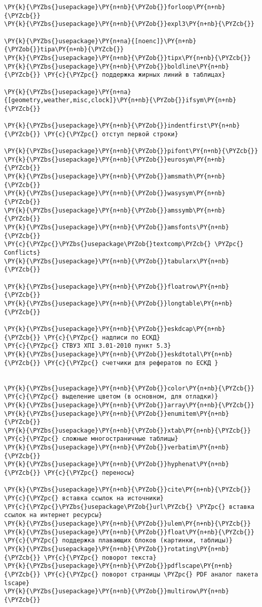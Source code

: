 \begin{Verbatim}[commandchars=\\\{\}]
\PY{k}{\PYZbs{}usepackage}\PY{n+nb}{\PYZob{}}forloop\PY{n+nb}{\PYZcb{}}
\PY{k}{\PYZbs{}usepackage}\PY{n+nb}{\PYZob{}}expl3\PY{n+nb}{\PYZcb{}}

\PY{k}{\PYZbs{}usepackage}\PY{n+na}{[noenc]}\PY{n+nb}{\PYZob{}}tipa\PY{n+nb}{\PYZcb{}}
\PY{k}{\PYZbs{}usepackage}\PY{n+nb}{\PYZob{}}tipx\PY{n+nb}{\PYZcb{}}
\PY{k}{\PYZbs{}usepackage}\PY{n+nb}{\PYZob{}}boldline\PY{n+nb}{\PYZcb{}} \PY{c}{\PYZpc{} поддержка жирных линий в таблицах}

\PY{k}{\PYZbs{}usepackage}\PY{n+na}{[geometry,weather,misc,clock]}\PY{n+nb}{\PYZob{}}ifsym\PY{n+nb}{\PYZcb{}}

\PY{k}{\PYZbs{}usepackage}\PY{n+nb}{\PYZob{}}indentfirst\PY{n+nb}{\PYZcb{}} \PY{c}{\PYZpc{} отступ первой строки}

\PY{k}{\PYZbs{}usepackage}\PY{n+nb}{\PYZob{}}pifont\PY{n+nb}{\PYZcb{}}
\PY{k}{\PYZbs{}usepackage}\PY{n+nb}{\PYZob{}}eurosym\PY{n+nb}{\PYZcb{}}
\PY{k}{\PYZbs{}usepackage}\PY{n+nb}{\PYZob{}}amsmath\PY{n+nb}{\PYZcb{}}
\PY{k}{\PYZbs{}usepackage}\PY{n+nb}{\PYZob{}}wasysym\PY{n+nb}{\PYZcb{}}
\PY{k}{\PYZbs{}usepackage}\PY{n+nb}{\PYZob{}}amssymb\PY{n+nb}{\PYZcb{}}
\PY{k}{\PYZbs{}usepackage}\PY{n+nb}{\PYZob{}}amsfonts\PY{n+nb}{\PYZcb{}}
\PY{c}{\PYZpc{}\PYZbs{}usepackage\PYZob{}textcomp\PYZcb{} \PYZpc{} Conflicts}
\PY{k}{\PYZbs{}usepackage}\PY{n+nb}{\PYZob{}}tabularx\PY{n+nb}{\PYZcb{}}

\PY{k}{\PYZbs{}usepackage}\PY{n+nb}{\PYZob{}}floatrow\PY{n+nb}{\PYZcb{}}
\PY{k}{\PYZbs{}usepackage}\PY{n+nb}{\PYZob{}}longtable\PY{n+nb}{\PYZcb{}}

\PY{k}{\PYZbs{}usepackage}\PY{n+nb}{\PYZob{}}eskdcap\PY{n+nb}{\PYZcb{}} \PY{c}{\PYZpc{} надписи по ЕСКД}
\PY{c}{\PYZpc{} СТВУЗ ХПІ 3.01-2010 пункт 5.3}
\PY{k}{\PYZbs{}usepackage}\PY{n+nb}{\PYZob{}}eskdtotal\PY{n+nb}{\PYZcb{}} \PY{c}{\PYZpc{} счетчики для рефератов по ЕСКД }


\PY{k}{\PYZbs{}usepackage}\PY{n+nb}{\PYZob{}}color\PY{n+nb}{\PYZcb{}} \PY{c}{\PYZpc{} выделение цветом (в основном, для отладки)}
\PY{k}{\PYZbs{}usepackage}\PY{n+nb}{\PYZob{}}array\PY{n+nb}{\PYZcb{}}
\PY{k}{\PYZbs{}usepackage}\PY{n+nb}{\PYZob{}}enumitem\PY{n+nb}{\PYZcb{}}
\PY{k}{\PYZbs{}usepackage}\PY{n+nb}{\PYZob{}}xtab\PY{n+nb}{\PYZcb{}} \PY{c}{\PYZpc{} сложные многостраничные таблицы}
\PY{k}{\PYZbs{}usepackage}\PY{n+nb}{\PYZob{}}verbatim\PY{n+nb}{\PYZcb{}} 
\PY{k}{\PYZbs{}usepackage}\PY{n+nb}{\PYZob{}}hyphenat\PY{n+nb}{\PYZcb{}} \PY{c}{\PYZpc{} переносы}

\PY{k}{\PYZbs{}usepackage}\PY{n+nb}{\PYZob{}}cite\PY{n+nb}{\PYZcb{}} \PY{c}{\PYZpc{} вставка ссылок на источники}
\PY{c}{\PYZpc{}\PYZbs{}usepackage\PYZob{}url\PYZcb{} \PYZpc{} вставка ссылок на интернет ресурсы}
\PY{k}{\PYZbs{}usepackage}\PY{n+nb}{\PYZob{}}ulem\PY{n+nb}{\PYZcb{}}
\PY{k}{\PYZbs{}usepackage}\PY{n+nb}{\PYZob{}}float\PY{n+nb}{\PYZcb{}} \PY{c}{\PYZpc{} поддержка плавающих блоков (картинки, таблицы)}
\PY{k}{\PYZbs{}usepackage}\PY{n+nb}{\PYZob{}}rotating\PY{n+nb}{\PYZcb{}} \PY{c}{\PYZpc{} поворот текста}
\PY{k}{\PYZbs{}usepackage}\PY{n+nb}{\PYZob{}}pdflscape\PY{n+nb}{\PYZcb{}} \PY{c}{\PYZpc{} поворот страницы \PYZpc{} PDF аналог пакета lscape}
\PY{k}{\PYZbs{}usepackage}\PY{n+nb}{\PYZob{}}multirow\PY{n+nb}{\PYZcb{}}


\end{Verbatim}

